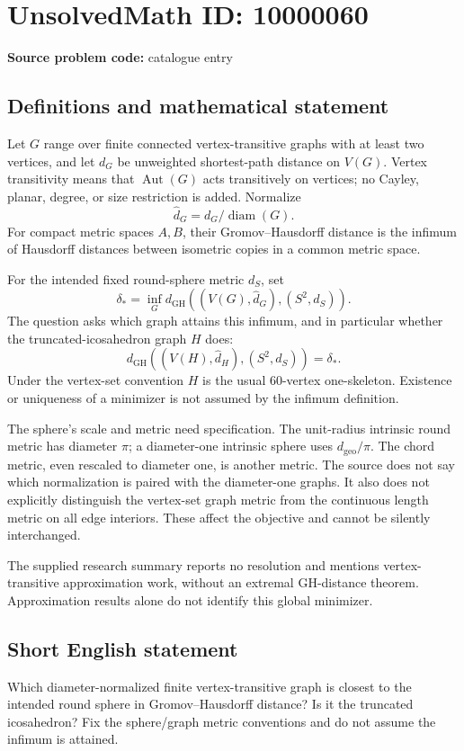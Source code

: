 \documentclass[11pt]{article}
\begin{document}
\section*{UnsolvedMath ID: 10000060}
\textbf{Source problem code:} catalogue entry
\subsection{Definitions and mathematical statement}
Let \(G\) range over finite connected vertex-transitive graphs with at least two vertices, and let \(d_G\) be unweighted shortest-path distance on \(V(G)\). Vertex transitivity means that \(\operatorname{Aut}(G)\) acts transitively on vertices; no Cayley, planar, degree, or size restriction is added. Normalize
\[
\widehat d_G=d_G/\operatorname{diam}(G).
\]
For compact metric spaces \(A,B\), their Gromov--Hausdorff distance is the infimum of Hausdorff distances between isometric copies in a common metric space.

For the intended fixed round-sphere metric \(d_S\), set
\[
\delta_* = \inf_G d_{\mathrm{GH}}((V(G),\widehat d_G),(S^2,d_S)).
\]
The question asks which graph attains this infimum, and in particular whether the truncated-icosahedron graph \(H\) does:
\[
d_{\mathrm{GH}}((V(H),\widehat d_H),(S^2,d_S))=\delta_*.
\]
Under the vertex-set convention \(H\) is the usual 60-vertex one-skeleton. Existence or uniqueness of a minimizer is not assumed by the infimum definition.

The sphere's scale and metric need specification. The unit-radius intrinsic round metric has diameter \(\pi\); a diameter-one intrinsic sphere uses \(d_{\mathrm{geo}}/\pi\). The chord metric, even rescaled to diameter one, is another metric. The source does not say which normalization is paired with the diameter-one graphs. It also does not explicitly distinguish the vertex-set graph metric from the continuous length metric on all edge interiors. These affect the objective and cannot be silently interchanged.

The supplied research summary reports no resolution and mentions vertex-transitive approximation work, without an extremal GH-distance theorem. Approximation results alone do not identify this global minimizer.
\subsection{Short English statement}
Which diameter-normalized finite vertex-transitive graph is closest to the intended round sphere in Gromov--Hausdorff distance? Is it the truncated icosahedron? Fix the sphere/graph metric conventions and do not assume the infimum is attained.
\end{document}
